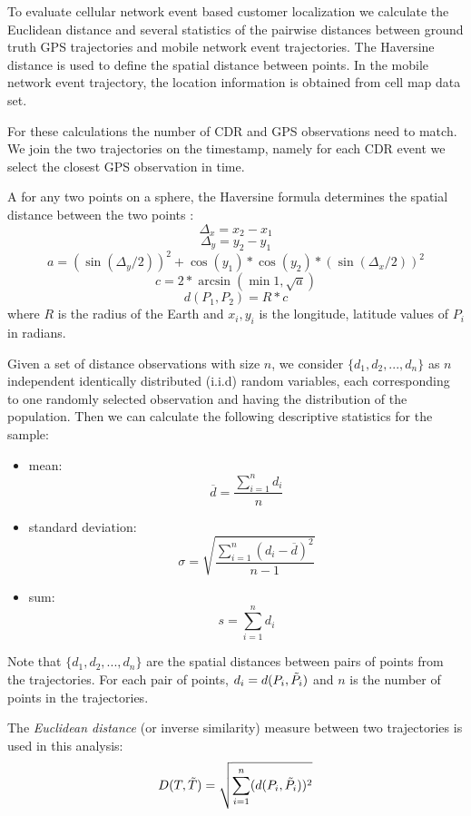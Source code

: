 To evaluate cellular network event based customer localization we calculate the Euclidean distance and several statistics of the pairwise distances between ground truth GPS trajectories and mobile network event trajectories. The Haversine distance is used to define the spatial distance between points. In the mobile network event trajectory, the location information is obtained from cell map data set.

For these calculations the number of CDR and GPS observations need to match. We join the two trajectories on the timestamp, namely for each CDR event we select the closest GPS observation in time.

\begin{definition}
A for any two points on a sphere, the Haversine formula determines the spatial distance between the two points \cite{haversine}:
    \[\Delta_{x} = x_{2} - x_{1}\]
    \[\Delta_{y} = y_{2} - y_{1}\]
    \[a = (\sin(\Delta_{y}/2))^2 + \cos{(y_{1})} * \cos{(y_{2})} * (\sin{(\Delta_{x}/2)})^2 \]
    \[c = 2 * \arcsin{(\min{1,\sqrt{a}})}\]
    \[d(P_{1}, P_{2}) = R * c\]
    where $R$ is the radius of the Earth and $x_{i}, y_{i}$ is the longitude, latitude values of $P_{i}$ in radians.
\end{definition}

Given a set of distance observations with size $n$, we consider $\{d_{1}, d_{2}, ..., d_{n}\}$ as $n$ independent identically distributed (i.i.d) random variables, each corresponding to one randomly selected observation and having the distribution of the population. Then we can calculate the following descriptive statistics for the sample:
\begin{itemize}
    \item mean:
     \[ \overline {d} = \frac{\sum_{i=1}^{n} d_{i}}{n}\]
     \item standard deviation:
    \[ \sigma={\sqrt {\frac {\sum _{i=1}^{n}(d_{i}-{\overline {d}})^{2}}{n-1}}}\]
    \item sum:        
    \[s = \sum_{i=1}^{n} d_{i}\]
\end{itemize}

Note that $\{d_{1}, d_{2}, ..., d_{n}\}$ are the spatial distances between pairs of points from the trajectories. For each pair of points, $d_{i} = d(P_{i},\Tilde{P_{i}})$ and $n$ is the number of points in the trajectories.

The \textit{Euclidean distance} (or inverse similarity) measure between two trajectories is used in this analysis:
\[D(T,\Tilde{T}) = \sqrt{\sum_{i=1}^{n} (d(P_{i},\Tilde{P_{i}}))^{2}}\]

